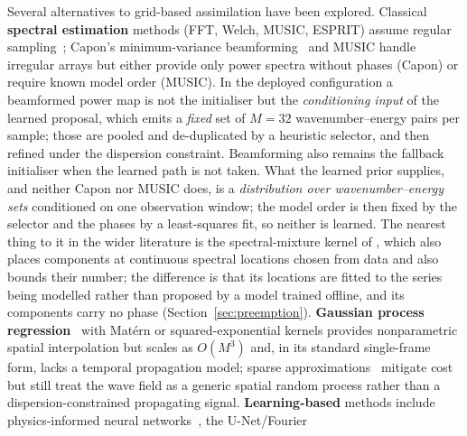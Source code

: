 \documentclass[review]{elsarticle}
\begin{document}
Several alternatives to grid-based assimilation have been explored.
Classical \textbf{spectral estimation} methods (FFT, Welch, MUSIC,
ESPRIT) assume regular sampling~\citep{young1994}; Capon's
minimum-variance beamforming~\citep{capon1969} and MUSIC
\citep{schmidt1986} handle irregular arrays but either provide only
power spectra without phases (Capon) or require known model order
(MUSIC).  In the deployed configuration a beamformed power map is not the
initialiser but the \emph{conditioning input} of the learned proposal, which emits a
\emph{fixed} set of $M=32$ wavenumber--energy pairs per sample; those are pooled and
de-duplicated by a heuristic selector, and then refined under the dispersion constraint.
Beamforming also remains the fallback initialiser when the learned path is not taken.
What the learned prior supplies, and neither Capon nor MUSIC does, is a
\emph{distribution over wavenumber--energy sets} conditioned on one observation window;
the model order is then fixed by the selector and the phases by a least-squares fit, so
neither is learned.
The nearest thing to it in the wider literature is the spectral-mixture kernel of
\citet{WilsonAdams2013}, which also places components at continuous spectral
locations chosen from data and also bounds their number; the difference is that its
locations are fitted to the series being modelled rather than proposed by a model
trained offline, and its components carry no phase
(Section~\ref{sec:preemption}).
\textbf{Gaussian process regression}~\citep{rasmussen2006} with
Mat\'ern or squared-exponential kernels provides nonparametric
spatial interpolation but scales as $O(M^3)$ and, in its standard
single-frame form, lacks a temporal propagation model; sparse
approximations~\citep{titsias2009} mitigate cost but still treat
the wave field as a generic spatial random process rather than a
dispersion-constrained propagating signal.
\textbf{Learning-based} methods include physics-informed neural
networks~\citep{liu2024, mohaghegh2021}, the U-Net/Fourier
\end{document}
